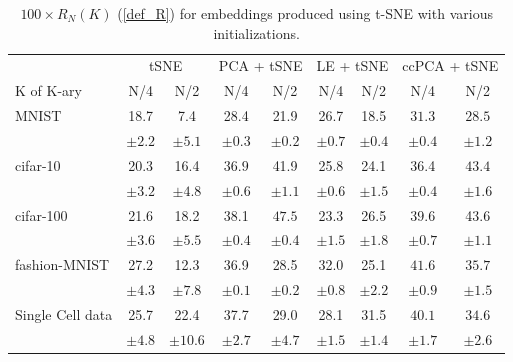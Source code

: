 \begin{table}[h]
\caption{$100 \times R_{N}(K)$ (\ref{def_R}) for embeddings produced using t-SNE with various initializations.}
\begin{footnotesize}
\begin{center}
\begin{tabular}{lcccccccc}
\toprule
& \multicolumn{2}{c}{tSNE} & \multicolumn{2}{c}{PCA + tSNE} & \multicolumn{2}{c}{LE + tSNE} & \multicolumn{2}{c}{ccPCA + tSNE} \\
\cmidrule(lr){2-3}\cmidrule(lr){4-5}\cmidrule(lr){6-7}\cmidrule(lr){8-9}
K of K-ary & {N/4} & {N/2}  & {N/4} & {N/2} & {N/4} & {N/2} & {N/4} & {N/2} \\
\midrule
MNIST & 18.7 & 7.4 & 28.4 & 21.9 & 26.7 & 18.5 & $\bm{31.3}$ & $\bm{28.5}$ \\
& $\pm 2.2$ & $\pm 5.1$ & $\pm 0.3$ & $\pm 0.2$ & $\pm 0.7$ & $\pm 0.4$ & $\pm 0.4$ & $\pm 1.2$ 
\vspace{0.1cm}
\\
cifar-10 & 20.3 & 16.4 & $\bm{36.9}$ & 41.9 & 25.8 & 24.1 & 36.4 & $\bm{43.4}$ \\
& $\pm 3.2$ & $\pm 4.8$ & $\pm 0.6$ & $\pm 1.1$ & $\pm 0.6$ & $\pm 1.5$ & $\pm 0.4$ & $\pm 1.6$
\vspace{0.1cm}
\\
cifar-100 & 21.6 & 18.2 & 38.1 & $\bm{47.5}$ & 23.3 & 26.5 & $\bm{39.6}$ & 43.6 \\
& $\pm 3.6$ & $\pm 5.5$ & $\pm 0.4$ & $\pm 0.4$ & $\pm 1.5$ & $\pm 1.8$ & $\pm 0.7$ & $\pm 1.1$
\vspace{0.1cm}
\\
fashion-MNIST & 27.2 & 12.3 & 36.9 & 28.5 & 32.0 & 25.1 & $\bm{41.6}$ & $\bm{35.7}$ \\
& $\pm 4.3$ & $\pm 7.8$ & $\pm 0.1$ & $\pm 0.2$ & $\pm 0.8$ & $\pm 2.2$ & $\pm 0.9$ & $\pm 1.5$
\vspace{0.1cm}
\\
Single Cell data & 25.7 & 22.4 & 37.7 & 29.0 & 28.1 & 31.5 & $\bm{40.1}$ & $\bm{34.6}$ \\
& $\pm 4.8$ & $\pm 10.6$ & $\pm 2.7$ & $\pm 4.7$ & $\pm 1.5$ & $\pm 1.4$ & $\pm 1.7$ & $\pm 2.6$
\\
\bottomrule
\end{tabular}
\end{center}
\end{footnotesize}
\label{tSNE_quantitative_results}
\end{table}


